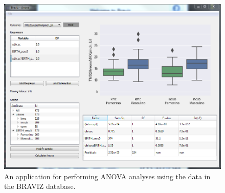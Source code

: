 \documentclass{frontiersHLTH}
\begin{document}
\begin{figure}
\begin{center}
\includegraphics[width=\linewidth]{anova.png}
\end{center}
 \caption{\label{fig_anova}An application for performing ANOVA analyses using the data in the BRAVIZ database.}
\end{figure}
\end{document}

